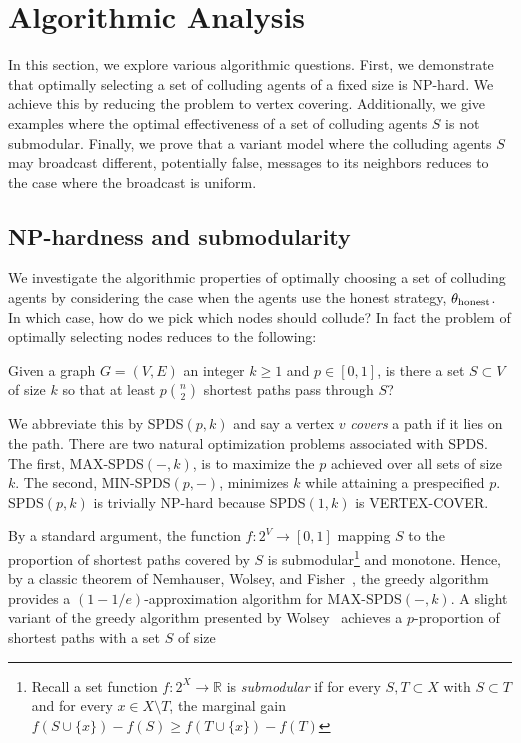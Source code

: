 \documentclass{comnet}
\begin{document}
\section{Algorithmic Analysis}

In this section, we explore various algorithmic questions. First, we
demonstrate that optimally selecting a set of colluding agents of a fixed size
is NP-hard. We achieve this by reducing the problem to vertex covering.
Additionally, we give examples where the optimal effectiveness of a set of
colluding agents $S$ is not submodular. Finally, we prove that a variant model
where the colluding agents $S$ may broadcast different, potentially false,
messages to its neighbors reduces to the case where the broadcast is uniform.

\subsection{NP-hardness and submodularity} \label{sec:combinatorial}

We investigate the algorithmic properties of optimally choosing a set of
colluding agents by considering the case when the agents use the honest
strategy, $\theta_{\textup{honest}}$. In which case, how do we pick which nodes
should collude? In fact the problem of optimally selecting nodes reduces to the
following:

\begin{problem} \label{prob:spds}
Given a graph $G = (V,E)$ an integer $k \geq 1$ and $p \in [0,1]$, is there a
set $S \subset V$ of size $k$ so that at least $p \binom{n}{2}$ shortest paths
pass through $S$?
\end{problem}

We abbreviate this by SPDS$(p,k)$ and say a vertex $v$ \emph{covers} a path if
it lies on the path. There are two natural optimization problems associated
with SPDS. The first, MAX-SPDS$(-,k)$, is to maximize the $p$ achieved over all
sets of size $k$. The second, MIN-SPDS$(p,-)$, minimizes $k$ while attaining a
prespecified $p$. SPDS$(p,k)$ is trivially NP-hard because SPDS$(1, k)$ is
VERTEX-COVER.
 
By a standard argument, the function $f: 2^V \to [0,1]$ mapping $S$ to the
proportion of shortest paths covered by $S$ is submodular\footnote{Recall a set
function $f:2^X \to \mathbb{R}$ is \emph{submodular} if for every $S, T \subset
X$ with $S \subset T$ and for every $x \in X \setminus T$, the marginal gain
$f(S \cup \{ x \}) - f(S) \geq f(T \cup \{ x \}) - f(T)$} and monotone.  Hence,
by a classic theorem of Nemhauser, Wolsey, and Fisher~\cite{NemhauserWF78}, the
greedy algorithm provides a $(1-1/e)$-approximation algorithm for
MAX-SPDS$(-,k)$. A slight variant of the greedy algorithm presented by
Wolsey~\cite{Wolsey82} achieves a $p$-proportion of shortest paths with a set
$S$ of size
\end{document}

